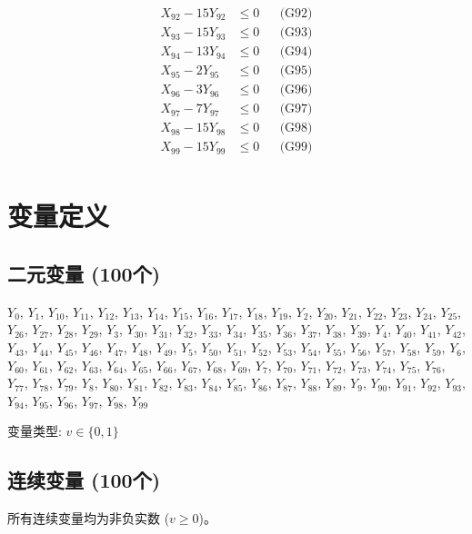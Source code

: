 \documentclass[a4paper,10pt]{article}
\begin{document}
{\begin{align}
X_{92} - 15Y_{92} &\leq 0 && \text{(G92)} \\
X_{93} - 15Y_{93} &\leq 0 && \text{(G93)} \\
X_{94} - 13Y_{94} &\leq 0 && \text{(G94)} \\
X_{95} - 2Y_{95} &\leq 0 && \text{(G95)} \\
X_{96} - 3Y_{96} &\leq 0 && \text{(G96)} \\
X_{97} - 7Y_{97} &\leq 0 && \text{(G97)} \\
X_{98} - 15Y_{98} &\leq 0 && \text{(G98)} \\
X_{99} - 15Y_{99} &\leq 0 && \text{(G99)} \\
\allowbreak
\end{align}}

\section{变量定义}

\subsection{二元变量 (100个)}

{\small $Y_{0}$, $Y_{1}$, $Y_{10}$, $Y_{11}$, $Y_{12}$, $Y_{13}$, $Y_{14}$, $Y_{15}$, $Y_{16}$, $Y_{17}$, $Y_{18}$, $Y_{19}$, $Y_{2}$, $Y_{20}$, $Y_{21}$, $Y_{22}$, $Y_{23}$, $Y_{24}$, $Y_{25}$, $Y_{26}$, $Y_{27}$, $Y_{28}$, $Y_{29}$, $Y_{3}$, $Y_{30}$, $Y_{31}$, $Y_{32}$, $Y_{33}$, $Y_{34}$, $Y_{35}$, $Y_{36}$, $Y_{37}$, $Y_{38}$, $Y_{39}$, $Y_{4}$, $Y_{40}$, $Y_{41}$, $Y_{42}$, $Y_{43}$, $Y_{44}$, $Y_{45}$, $Y_{46}$, $Y_{47}$, $Y_{48}$, $Y_{49}$, $Y_{5}$, $Y_{50}$, $Y_{51}$, $Y_{52}$, $Y_{53}$, $Y_{54}$, $Y_{55}$, $Y_{56}$, $Y_{57}$, $Y_{58}$, $Y_{59}$, $Y_{6}$, $Y_{60}$, $Y_{61}$, $Y_{62}$, $Y_{63}$, $Y_{64}$, $Y_{65}$, $Y_{66}$, $Y_{67}$, $Y_{68}$, $Y_{69}$, $Y_{7}$, $Y_{70}$, $Y_{71}$, $Y_{72}$, $Y_{73}$, $Y_{74}$, $Y_{75}$, $Y_{76}$, $Y_{77}$, $Y_{78}$, $Y_{79}$, $Y_{8}$, $Y_{80}$, $Y_{81}$, $Y_{82}$, $Y_{83}$, $Y_{84}$, $Y_{85}$, $Y_{86}$, $Y_{87}$, $Y_{88}$, $Y_{89}$, $Y_{9}$, $Y_{90}$, $Y_{91}$, $Y_{92}$, $Y_{93}$, $Y_{94}$, $Y_{95}$, $Y_{96}$, $Y_{97}$, $Y_{98}$, $Y_{99}$}

变量类型: $v \in \{0,1\}$

\subsection{连续变量 (100个)}

所有连续变量均为非负实数 ($v \geq 0$)。
\end{document}

